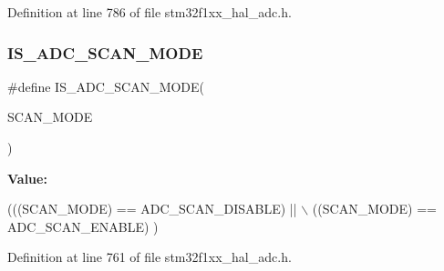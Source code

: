 Definition at line 786 of file stm32f1xx\+\_\+hal\+\_\+adc.\+h.

\mbox{\label{group___a_d_c___private___macros_gad86e7d7e94679a54f66e79b002f936f0}} 
\subsubsection{\texorpdfstring{I\+S\+\_\+\+A\+D\+C\+\_\+\+S\+C\+A\+N\+\_\+\+M\+O\+DE}{IS\_ADC\_SCAN\_MODE}}
{\footnotesize\ttfamily \#define I\+S\+\_\+\+A\+D\+C\+\_\+\+S\+C\+A\+N\+\_\+\+M\+O\+DE(\begin{DoxyParamCaption}\item[{}]{S\+C\+A\+N\+\_\+\+M\+O\+DE }\end{DoxyParamCaption})}

{\bfseries Value\+:}
\begin{DoxyCode}
(((SCAN\_MODE) == ADC\_SCAN\_DISABLE) || \(\backslash\)
                                     ((SCAN\_MODE) == ADC\_SCAN\_ENABLE)    )
\end{DoxyCode}


Definition at line 761 of file stm32f1xx\+\_\+hal\+\_\+adc.\+h.

